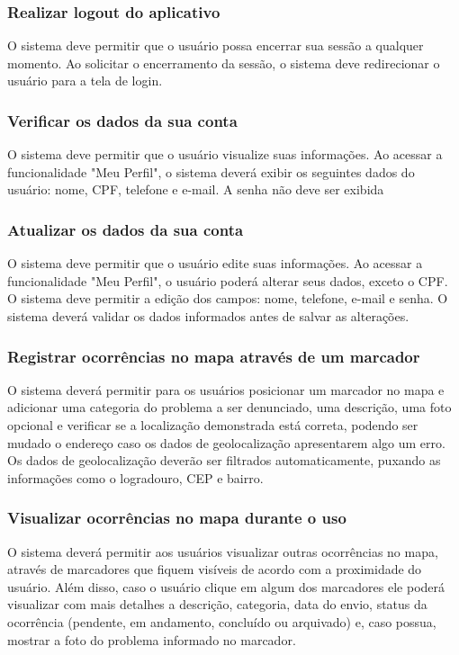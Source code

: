 \subsubsection{Realizar logout do aplicativo}

O sistema deve permitir que o usuário possa encerrar sua sessão a qualquer momento. Ao solicitar o encerramento da sessão, o sistema deve redirecionar o usuário para a tela de login.

\subsubsection{Verificar os dados da sua conta}

O sistema deve permitir que o usuário visualize suas informações. Ao acessar a funcionalidade "Meu Perfil", o sistema deverá exibir os seguintes dados do usuário: nome, CPF, telefone e e-mail. A senha não deve ser exibida

\subsubsection{Atualizar os dados da sua conta}

O sistema deve permitir que o usuário edite suas informações. Ao acessar a funcionalidade "Meu Perfil", o usuário poderá alterar seus dados, exceto o CPF. O sistema deve permitir a edição dos campos: nome, telefone, e-mail e senha. O sistema deverá validar os dados informados antes de salvar as alterações.

\subsubsection{Registrar ocorrências no mapa através de um marcador}

O sistema deverá permitir para os usuários posicionar um marcador no mapa e adicionar uma categoria do problema a ser denunciado, uma descrição, uma foto opcional e verificar se a localização demonstrada está correta, podendo ser mudado o endereço caso os dados de geolocalização apresentarem algo um erro.
Os dados de geolocalização deverão ser filtrados automaticamente, puxando as informações como o logradouro, CEP e bairro.

\subsubsection{Visualizar ocorrências no mapa durante o uso}

O sistema deverá permitir aos usuários visualizar outras ocorrências no mapa, através de marcadores que fiquem visíveis de acordo com a proximidade do usuário. Além disso, caso o usuário clique em algum dos marcadores ele poderá visualizar com mais detalhes a descrição, categoria, data do envio, status da ocorrência (pendente, em andamento, concluído ou arquivado) e, caso possua, mostrar a foto do problema informado no marcador.

